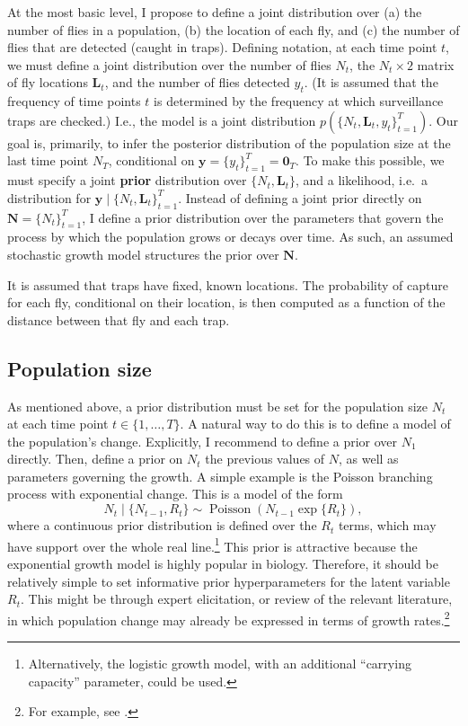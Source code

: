 \documentclass[
  oneside]{book}
\begin{document}
At the most basic level, I propose to define a joint distribution over (a) the number of flies in a population, (b) the location of each fly, and (c) the number of flies that are detected (caught in traps). Defining notation, at each time point \(t\), we must define a joint distribution over the number of flies \(N_t\), the \(N_t \times 2\) matrix of fly locations \(\mathbf L_t\), and the number of flies detected \(y_t\). (It is assumed that the frequency of time points \(t\) is determined by the frequency at which surveillance traps are checked.) I.e., the model is a joint distribution \(p(\{N_t, \mathbf L_t, y_t\}_{t=1}^T)\). Our goal is, primarily, to infer the posterior distribution of the population size at the last time point \(N_T\), conditional on \(\mathbf y = \{y_t\}_{t=1}^T = \mathbf 0_T\). To make this possible, we must specify a joint \textbf{prior} distribution over \(\{N_t, \mathbf L_t\}\), and a likelihood, i.e.~a distribution for \(\mathbf y \mid \{N_t, \mathbf L_t\}_{t=1}^T\). Instead of defining a joint prior directly on \(\mathbf N = \{N_t\}_{t=1}^T\), I define a prior distribution over the parameters that govern the process by which the population grows or decays over time. As such, an assumed stochastic growth model structures the prior over \(\mathbf N\).

It is assumed that traps have fixed, known locations. The probability of capture for each fly, conditional on their location, is then computed as a function of the distance between that fly and each trap.

\hypertarget{population-size}{%
\subsection{Population size}\label{population-size}}

As mentioned above, a prior distribution must be set for the population size \(N_t\) at each time point \(t \in \{1, \ldots, T\}\). A natural way to do this is to define a model of the population's change. Explicitly, I recommend to define a prior over \(N_1\) directly. Then, define a prior on \(N_t\) the previous values of \(N\), as well as parameters governing the growth. A simple example is the Poisson branching process with exponential change. This is a model of the form
\[
N_t \mid \{N_{t-1}, R_t\} \sim \operatorname{Poisson}(N_{t-1} \exp \{R_t\}),
\]
where a continuous prior distribution is defined over the \(R_t\) terms, which may have support over the whole real line.\footnote{Alternatively, the logistic growth model, with an additional ``carrying capacity'' parameter, could be used.} This prior is attractive because the exponential growth model is highly popular in biology. Therefore, it should be relatively simple to set informative prior hyperparameters for the latent variable \(R_t\). This might be through expert elicitation, or review of the relevant literature, in which population change may already be expressed in terms of growth rates.\footnote{For example, see \citet{papadopoulos2002}.}
\end{document}

